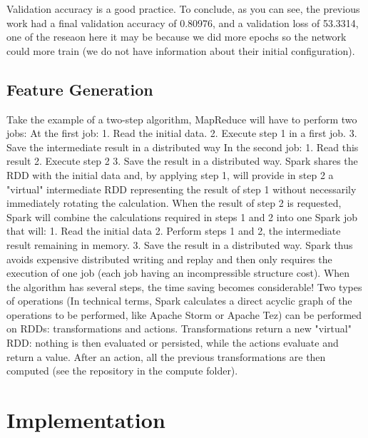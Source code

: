 \documentclass{acmtog} %
\begin{document}
\begin{itemize}
Validation accuracy is a good practice.
To conclude, as you can see, the previous work had a final validation accuracy of 0.80976, and a validation loss of 53.3314, one of the reseaon here it may be because we did more epochs so the network could more train (we do not have information about their initial configuration).

\subsection{Feature Generation}
\label{subsub:featureGeneration}

Take the example of a two-step algorithm, MapReduce will have to perform two jobs:
At the first job:
1.	Read the initial data.
2.	Execute step 1 in a first job.
3.	Save the intermediate result in a distributed way
In the second job:
1.	Read this result
2.	Execute step 2
3.	Save the result in a distributed way.
Spark shares the RDD with the initial data and, by applying step 1, will provide in step 2 a "virtual" intermediate RDD representing the result of step 1 without necessarily immediately rotating the calculation. When the result of step 2 is requested, Spark will combine the calculations required in steps 1 and 2 into one Spark job that will:
1.	Read the initial data
2.	Perform steps 1 and 2, the intermediate result remaining in memory.
3.	Save the result in a distributed way.
Spark thus avoids expensive distributed writing and replay and then only requires the execution of one job (each job having an incompressible structure cost).
When the algorithm has several steps, the time saving becomes considerable!
Two types of operations (In technical terms, Spark calculates a direct acyclic graph of the operations to be performed, like Apache Storm or Apache Tez) can be performed on RDDs: transformations and actions. Transformations return a new "virtual" RDD: nothing is then evaluated or persisted, while the actions evaluate and return a value. After an action, all the previous transformations are then computed (see the repository in the compute folder).

\section{Implementation}
\label{sec:implementation}


\end{itemize}
\end{document}
